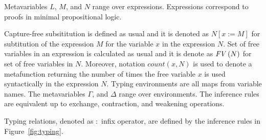 \documentclass[11p,a4paper]{article}
\newcommand{\sbs}[3]{#1[#2:=#3]}
\newcommand{\fv}[1]{\txt{FV}\,(#1)}
\newcommand{\txt}[1]{\text{\textit{#1}}}
\begin{document}
Metavariables $L$, $M$, and $N$ range over expressions. Expressions
correspond to proofs in minimal propositional logic.


Capture-free subsititution is defined as usual and it is denoted as
$\sbs{N}{x}{M}$ for subtitution of the expression $M$ for the variable
$x$ in the expression $N$. Set of free variables in an expression is
calculated as usual and it is denote as $\fv{N}$ for set of free
variables in $N$. Moreover, notation $count(x,N)$ is used to denote a
metafunction returning the number of times the free variable $x$ is
used syntactically in the expression $N$.
Typing %
 environments are all maps from
variable names. The metavariables $\Gamma$, and $\Delta$ range over
environments.  The inference rules are equivalent up to exchange,
contraction, and weakening operations. 

Typing relations, denoted as $:$ infix operator, are defined by
the inference rules in Figure~\ref{fig:typing}.
\end{document}
